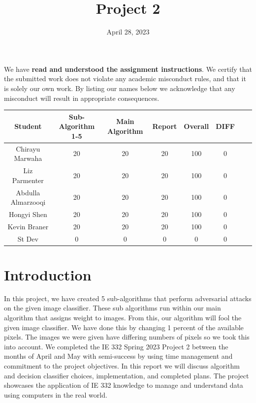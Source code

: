 \documentclass{article}
\title{Project 2}
\date{April 28, 2023}
\begin{document}
  


\maketitle
\noindent We have {\bf read and understood the assignment instructions}. We certify that the submitted work does not violate any academic misconduct rules, and that it is solely our own work. By listing our names below we acknowledge that any misconduct will result in appropriate consequences. 

\vspace{0.2in}


\vspace{0.3in}

\begin{table}[h!]
  \begin{center}
    \label{tab:table1}
     \begin{tabular}{c|ccccc|c|c}
      Student & Sub-Algorithm 1-5 & Main Algorithm  & Report & Overall & DIFF\\
      \hline
      Chirayu Marwaha & 20 & 20  & 20 & 100 & 0\\
      Liz Parmenter & 20 & 20  & 20 & 100 & 0\\
      Abdulla Almarzooqi & 20  & 20 & 20 & 100 & 0\\
      Hongyi Shen & 20 & 20 & 20 & 100 & 0\\
      Kevin Braner & 20 & 20 & 20 & 100 & 0\\
      \hline
      St Dev & 0 & 0 & 0 & 0 & 0 
    \end{tabular}
  \end{center}
\end{table}
\newpage
\section{Introduction}
In this project, we have created 5 sub-algorithms that perform adversarial attacks on the given image classifier. These sub algorithms run within our main algorithm that assigns weight to images. From this, our algorithm will fool the given image classifier. We have done this by changing 1 percent of the available pixels. The images we were given have differing numbers of pixels so we took this into account. We completed the IE 332 Spring 2023 Project 2 between the months of April and May with semi-success by using time management and commitment to the project objectives. In this report we will discuss algorithm and decision classifier choices, implementation, and completed plans. The project showcases the application of IE 332 knowledge to manage and understand data using computers in the real world.
\end{document}
